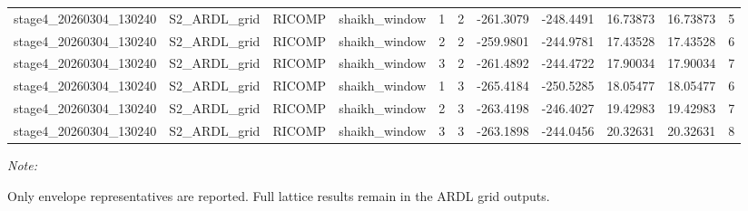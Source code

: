 \begin{table}[!h]
\begin{threeparttable}
\begin{tabular}[t]{llllrrrrrrr}
stage4\_20260304\_130240 & S2\_ARDL\_grid & RICOMP & shaikh\_window & 1 & 2 & -261.3079 & -248.4491 & 16.73873 & 16.73873 & 5\\
stage4\_20260304\_130240 & S2\_ARDL\_grid & RICOMP & shaikh\_window & 2 & 2 & -259.9801 & -244.9781 & 17.43528 & 17.43528 & 6\\
\addlinespace
stage4\_20260304\_130240 & S2\_ARDL\_grid & RICOMP & shaikh\_window & 3 & 2 & -261.4892 & -244.4722 & 17.90034 & 17.90034 & 7\\
stage4\_20260304\_130240 & S2\_ARDL\_grid & RICOMP & shaikh\_window & 1 & 3 & -265.4184 & -250.5285 & 18.05477 & 18.05477 & 6\\
stage4\_20260304\_130240 & S2\_ARDL\_grid & RICOMP & shaikh\_window & 2 & 3 & -263.4198 & -246.4027 & 19.42983 & 19.42983 & 7\\
stage4\_20260304\_130240 & S2\_ARDL\_grid & RICOMP & shaikh\_window & 3 & 3 & -263.1898 & -244.0456 & 20.32631 & 20.32631 & 8\\
\bottomrule
\end{tabular}
\begin{tablenotes}
\item \textit{Note: } 
\item Only envelope representatives are reported. Full lattice results remain in the ARDL grid outputs.
\end{tablenotes}
\end{threeparttable}
\end{table}
